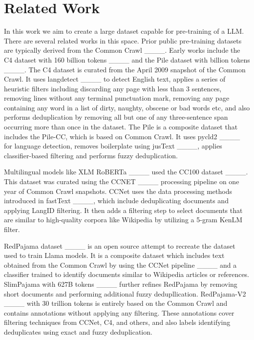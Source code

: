 \section{Related Work}
\label{relatedwork}


In this work we aim to create a large dataset capable for pre-training of a LLM. There are several related works in this space. Prior public pre-training datasets are typically derived from the Common Crawl ____. Early works include the C4 dataset with 160 billion tokens ____ and the Pile dataset with billion tokens ____. The C4 dataset is curated from the April 2009 snapshot of the Common Crawl. It uses langdetect ____ to detect English text, applies a series of heuristic filters including discarding any page with less than 3 sentences, removing lines without any terminal punctuation mark, removing any page containing any word in a list of dirty, naughty, obscene or bad words etc, and also performs deduplication by removing all but one of any three-sentence span occurring more than once in the dataset. The Pile is a composite dataset that includes the Pile-CC, which is based on Common Crawl. It uses pycld2 ____ for language detection, removes boilerplate using jusText ____, applies classifier-based filtering and performs fuzzy deduplication. 

Multilingual models like XLM RoBERTa ____ used the CC100 dataset ____. This dataset was curated using the CCNET ____ processing pipeline on one year of Common Crawl snapshots. CCNet uses the data processing methods introduced in fastText ____, which include deduplicating documents and applying LangID filtering. It then adds a filtering step to select documents that are similar to high-quality corpora like Wikipedia by utilizing a 5-gram KenLM filter.

RedPajama dataset ____ is an open source attempt to recreate the dataset used to train Llama models. It is a composite dataset which includes text obtained from the Common Crawl by using the CCNet pipeline ____ and a classifier trained to identify documents similar to Wikipedia articles or references. SlimPajama with 627B tokens ____ further refines RedPajama by removing short documents and performing additional fuzzy dedupllication. RedPajama-V2 ____ with 30 trillion tokens is entirely based on the Common Crawl and contains annotations without applying any filtering. These annotations cover filtering techniques from CCNet, C4, and others, and also labels identifying deduplicates using exact and fuzzy deduplication. 

